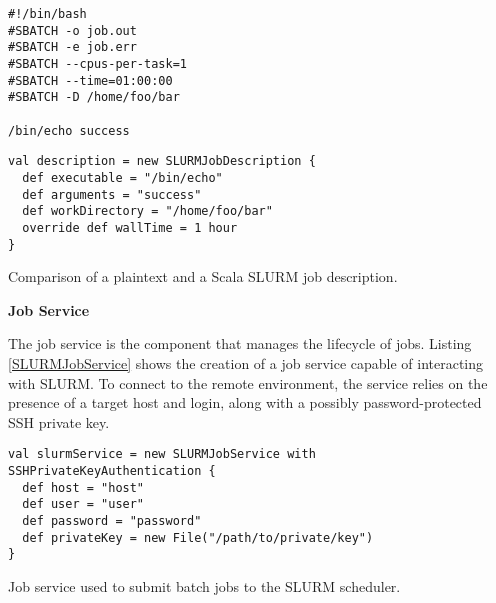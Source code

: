 \begin{listing}[h]
	\centering
	\begin{minipage}[b]{5.03cm}
		\begin{verbatim}
#!/bin/bash
#SBATCH -o job.out
#SBATCH -e job.err
#SBATCH --cpus-per-task=1 
#SBATCH --time=01:00:00
#SBATCH -D /home/foo/bar

/bin/echo success
        \end{verbatim}
	\end{minipage}
	\hspace{0.5cm}
    \begin{minipage}[b]{8.29cm}
		\begin{verbatim}
val description = new SLURMJobDescription { 
  def executable = "/bin/echo"
  def arguments = "success"
  def workDirectory = "/home/foo/bar"
  override def wallTime = 1 hour
}
		\end{verbatim}
	\end{minipage}
	\caption{Comparison of a plaintext and a Scala SLURM job description.}
	\label{SLURMJobDescription}
\end{listing}

\vspace{3mm}
\textbf{Job Service}
\vspace{1mm}

The job service is the component that manages the lifecycle of jobs. Listing \ref{SLURMJobService} shows the creation of a job service capable of interacting with SLURM. To connect to the remote environment, the service relies on the presence of a target host and login, along with a possibly password-protected SSH private key.

\begin{listing}[h]
	\centering
	\begin{minipage}{14cm}
		\begin{verbatim}
val slurmService = new SLURMJobService with SSHPrivateKeyAuthentication {
  def host = "host"
  def user = "user"
  def password = "password"
  def privateKey = new File("/path/to/private/key")
}
		\end{verbatim}
	\end{minipage}
	\caption{Job service used to submit batch jobs to the SLURM scheduler.}
	\label{SLURMJobService}
\end{listing}

